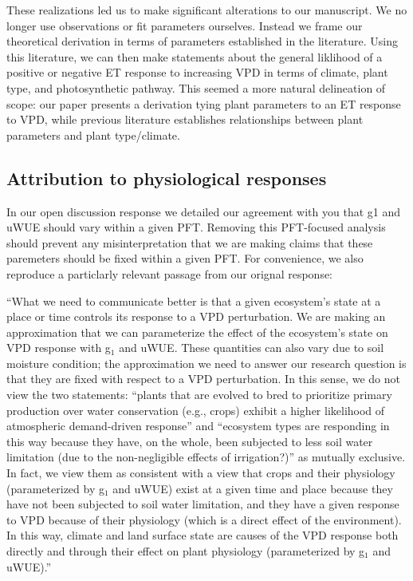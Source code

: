 \documentclass[12pt]{article}
\begin{document}
These realizations led us to make significant alterations to our
manuscript. We no longer use observations or fit parameters
ourselves. Instead we frame our theoretical derivation in terms of
parameters established in the literature. Using this literature, we
can then make statements about the general liklihood of a positive or
negative ET response to increasing VPD in terms of climate, plant
type, and photosynthetic pathway. This seemed a more natural
delineation of scope: our paper presents a derivation tying plant
parameters to an ET response to VPD, while previous literature
establishes relationships between plant parameters and plant
type/climate.

\subsection{Attribution to physiological responses}

In our open discussion response we detailed our agreement with you that g1 and
uWUE should vary within a given PFT. Removing this PFT-focused
analysis should prevent any misinterpretation that we are making
claims that these paremeters should be fixed within a given PFT. For
convenience, we also reproduce a particlarly relevant passage from our
orignal response:

``What we need to communicate better is that a given ecosystem's state
at a place or time controls its response to a VPD perturbation. We are
making an approximation that we can parameterize the effect of the
ecosystem's state on VPD response with g$_1$ and uWUE. These quantities
can also vary due to soil moisture condition; the approximation we
need to answer our research question is that they are fixed
with respect to a VPD perturbation. In this sense, we do not view the
two statements: ``plants that are evolved to bred to prioritize
primary production over water conservation (e.g., crops) exhibit a
higher likelihood of atmospheric demand-driven response'' and
``ecosystem types are responding in this way because they have, on the
whole, been subjected to less soil water limitation (due to the
non-negligible effects of irrigation?)'' as mutually exclusive. In
fact, we view them as consistent with a view that crops and their
physiology (parameterized by g$_1$ and uWUE) exist at a given time and
place because they have not been subjected to soil water limitation,
and they have a given response to VPD because of their physiology
(which is a direct effect of the environment). In this way, climate
and land surface state are causes of the VPD response both directly
and through their effect on plant physiology (parameterized by g$_1$
and uWUE).''
\end{document}
